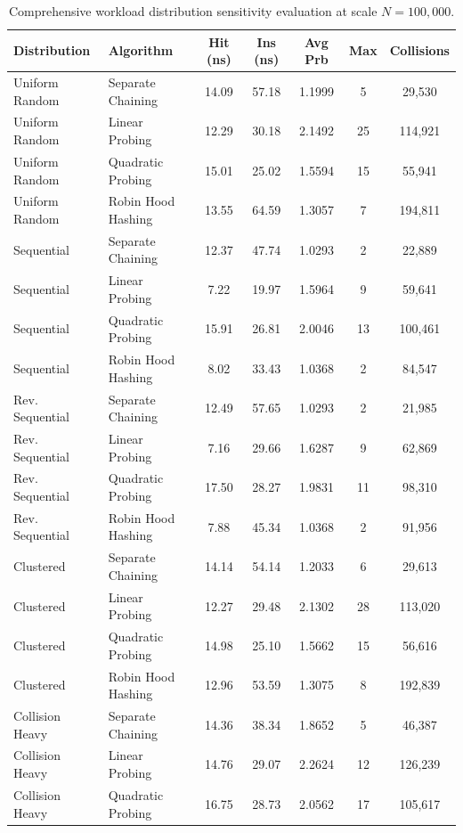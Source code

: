 \documentclass[conference]{IEEEtran}
\begin{document}
\begin{table}[t]
\centering
\caption{Comprehensive workload distribution sensitivity evaluation at scale $N = 100,000$.}
\label{tbl:distribution_sensitivity}
\begin{tabular}{llccccc}
\toprule
\textbf{Distribution} & \textbf{Algorithm} & \textbf{Hit (ns)} & \textbf{Ins (ns)} & \textbf{Avg Prb} & \textbf{Max} & \textbf{Collisions} \\
\midrule
Uniform Random & Separate Chaining & 14.09 & 57.18 & 1.1999 & 5 & 29,530 \\
Uniform Random & Linear Probing & 12.29 & 30.18 & 2.1492 & 25 & 114,921 \\
Uniform Random & Quadratic Probing & 15.01 & 25.02 & 1.5594 & 15 & 55,941 \\
Uniform Random & Robin Hood Hashing & 13.55 & 64.59 & 1.3057 & 7 & 194,811 \\
\midrule
Sequential & Separate Chaining & 12.37 & 47.74 & 1.0293 & 2 & 22,889 \\
Sequential & Linear Probing & 7.22 & 19.97 & 1.5964 & 9 & 59,641 \\
Sequential & Quadratic Probing & 15.91 & 26.81 & 2.0046 & 13 & 100,461 \\
Sequential & Robin Hood Hashing & 8.02 & 33.43 & 1.0368 & 2 & 84,547 \\
\midrule
Rev. Sequential & Separate Chaining & 12.49 & 57.65 & 1.0293 & 2 & 21,985 \\
Rev. Sequential & Linear Probing & 7.16 & 29.66 & 1.6287 & 9 & 62,869 \\
Rev. Sequential & Quadratic Probing & 17.50 & 28.27 & 1.9831 & 11 & 98,310 \\
Rev. Sequential & Robin Hood Hashing & 7.88 & 45.34 & 1.0368 & 2 & 91,956 \\
\midrule
Clustered & Separate Chaining & 14.14 & 54.14 & 1.2033 & 6 & 29,613 \\
Clustered & Linear Probing & 12.27 & 29.48 & 2.1302 & 28 & 113,020 \\
Clustered & Quadratic Probing & 14.98 & 25.10 & 1.5662 & 15 & 56,616 \\
Clustered & Robin Hood Hashing & 12.96 & 53.59 & 1.3075 & 8 & 192,839 \\
\midrule
Collision Heavy & Separate Chaining & 14.36 & 38.34 & 1.8652 & 5 & 46,387 \\
Collision Heavy & Linear Probing & 14.76 & 29.07 & 2.2624 & 12 & 126,239 \\
Collision Heavy & Quadratic Probing & 16.75 & 28.73 & 2.0562 & 17 & 105,617 \\

\end{tabular}
\end{table}
\end{document}
